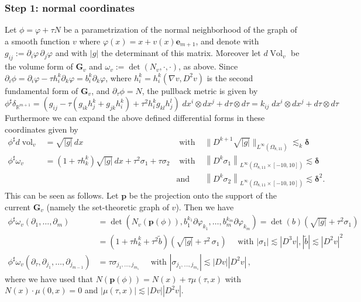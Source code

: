 \documentclass[reqno]{amsart}
\theoremstyle{definition}
\theoremstyle{remark}
\numberwithin{equation}{section}
\newcommand{\norm}[1]{\left\lVert#1\right\rVert}
\newcommand{\R}{\mathbb{R}}
\newcommand{\bG}{\mathbf{G}} %
\begin{document}
\subsubsection*{Step 1: normal coordinates}
Let $\phi=\varphi + \tau N$ be a parametrization of the normal neighborhood of the graph of a smooth function $v$ where $\varphi(x)= x + v(x) \boldsymbol{e}_{m+1}$, and denote with $g_{ij}:=\partial_i\varphi\,\partial_j\varphi$ and with $|g|$ the determinant of this matrix. Moreover let $d\operatorname{Vol}_v$ be the volume form of $\bG_v$ and $\omega_v:=\det(N_v,\cdot,\cdot)$, as above.  Since $\partial_i \phi= \partial_i\varphi - \tau h_i^k \partial_k \varphi= b^k_i \partial_k\varphi$, where $h_i^k=h_i^k(\nabla v, D^2v)$ is the second fundamental form of $\bG_v$, and $\partial_\tau\phi = N$, the pullback metric is given by
\[ \phi^\sharp \delta_{\R^{m+1}}= \left(g_{ij} - \tau \left(g_{ik}h^k_j + g_{jk}h^k_i\right) + \tau^2 h_i^kg_{kl}h^l_j\right) \;dx^i\otimes dx^j + d\tau\otimes d\tau = k_{ij}\;dx^i\otimes dx^j + d\tau\otimes d\tau\]
Furthermore we can expand the above defined differential forms in these coordinates given by 
\begin{align}
    \phi^\sharp d\operatorname{vol}_v&= \sqrt{|g|} \,dx &\text{ with }& \| D^{k+1} \sqrt{|g|}\|_{L^\infty(\Omega_{8,11})} \lesssim _k \boldsymbol{\delta} \label{eq.forms in normal coordinates1}\\
    \phi^\sharp \omega_v &= (1 + \tau h^k_k ) \sqrt{|g|} \, dx + \tau^2 \sigma_1 + \tau \sigma_2 &\text{ with }& \norm{ D^k\sigma_1}_{L^\infty(\Omega_{8,11}\times [-10,10])}\lesssim \boldsymbol{\delta}\nonumber\\
&& \text{and}&  \norm{ D^k\sigma_2}_{L^\infty(\Omega_{8,11}\times [-10,10])}\lesssim \boldsymbol{\delta}^2.\label{eq.forms in normal coordinates2}
\end{align}
This can be seen as follows. Let $\boldsymbol{p}$ be the projection onto the support of the current $\bG_v$ (namely the set-theoretic graph of $v$). Then we have 
\begin{align*}
    \phi^\sharp \omega_v( \partial_1, \dotsc ,\partial_m)&= \det(N_v(\boldsymbol{p}(\phi)), b_1^{k_1} \partial\varphi_{k_1}, \dots, b_m^{k_m} \partial\varphi_{k_m})= \det(b)\left(\sqrt{|g|} + \tau^2 \sigma_1\right) \\
    &=(1+\tau h^k_k + \tau^2 \tilde{b}) \left(\sqrt{|g|} + \tau^2\, \sigma_1\right) \quad\text{ with } |\sigma_1|\lesssim |D^3v|, |\tilde{b}|\lesssim |D^2v|^2\\
    \phi^\sharp \omega_v(\partial_\tau, \partial_{j_1}, \dotsc, \partial_{j_{m-1}})&= \tau \sigma_{j_1,\dotsc, j_{m_1}} \quad \text{ with } |\sigma_{j_1,\dotsc, j_{m_1}}|\lesssim |Dv||D^2v|\,,
\end{align*}
where we have used that $N(\boldsymbol{p}(\phi)) = N(x) + \tau \mu(\tau,x)$ with $N(x)\cdot \mu(0,x)=0$ and $|\mu(\tau,x)|\lesssim |Dv||D^2v|$.
\end{document}
